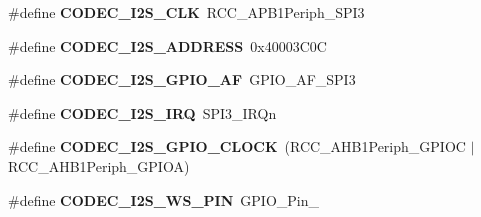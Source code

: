 \begin{DoxyCompactItemize}
\item 
\hypertarget{group___s_t_m32_f4___d_i_s_c_o_v_e_r_y___a_u_d_i_o___c_o_d_e_c___exported___constants_ga77e374b91de4f4bd2df16b28ca973553}{\#define {\bfseries C\-O\-D\-E\-C\-\_\-\-I2\-S\-\_\-\-C\-L\-K}~R\-C\-C\-\_\-\-A\-P\-B1\-Periph\-\_\-\-S\-P\-I3}\label{group___s_t_m32_f4___d_i_s_c_o_v_e_r_y___a_u_d_i_o___c_o_d_e_c___exported___constants_ga77e374b91de4f4bd2df16b28ca973553}

\item 
\hypertarget{group___s_t_m32_f4___d_i_s_c_o_v_e_r_y___a_u_d_i_o___c_o_d_e_c___exported___constants_gaff14a601909227234350c186a7bf0ea5}{\#define {\bfseries C\-O\-D\-E\-C\-\_\-\-I2\-S\-\_\-\-A\-D\-D\-R\-E\-S\-S}~0x40003\-C0\-C}\label{group___s_t_m32_f4___d_i_s_c_o_v_e_r_y___a_u_d_i_o___c_o_d_e_c___exported___constants_gaff14a601909227234350c186a7bf0ea5}

\item 
\hypertarget{group___s_t_m32_f4___d_i_s_c_o_v_e_r_y___a_u_d_i_o___c_o_d_e_c___exported___constants_ga1e5aba68422907a9a319ab444e40a8dd}{\#define {\bfseries C\-O\-D\-E\-C\-\_\-\-I2\-S\-\_\-\-G\-P\-I\-O\-\_\-\-A\-F}~G\-P\-I\-O\-\_\-\-A\-F\-\_\-\-S\-P\-I3}\label{group___s_t_m32_f4___d_i_s_c_o_v_e_r_y___a_u_d_i_o___c_o_d_e_c___exported___constants_ga1e5aba68422907a9a319ab444e40a8dd}

\item 
\hypertarget{group___s_t_m32_f4___d_i_s_c_o_v_e_r_y___a_u_d_i_o___c_o_d_e_c___exported___constants_ga96ef2e113c518e61212771532c6de8bd}{\#define {\bfseries C\-O\-D\-E\-C\-\_\-\-I2\-S\-\_\-\-I\-R\-Q}~S\-P\-I3\-\_\-\-I\-R\-Qn}\label{group___s_t_m32_f4___d_i_s_c_o_v_e_r_y___a_u_d_i_o___c_o_d_e_c___exported___constants_ga96ef2e113c518e61212771532c6de8bd}

\item 
\hypertarget{group___s_t_m32_f4___d_i_s_c_o_v_e_r_y___a_u_d_i_o___c_o_d_e_c___exported___constants_ga63156429ccf84bdbc35f3f2c36dfca07}{\#define {\bfseries C\-O\-D\-E\-C\-\_\-\-I2\-S\-\_\-\-G\-P\-I\-O\-\_\-\-C\-L\-O\-C\-K}~(R\-C\-C\-\_\-\-A\-H\-B1\-Periph\-\_\-\-G\-P\-I\-O\-C $|$ R\-C\-C\-\_\-\-A\-H\-B1\-Periph\-\_\-\-G\-P\-I\-O\-A)}\label{group___s_t_m32_f4___d_i_s_c_o_v_e_r_y___a_u_d_i_o___c_o_d_e_c___exported___constants_ga63156429ccf84bdbc35f3f2c36dfca07}

\item 
\hypertarget{group___s_t_m32_f4___d_i_s_c_o_v_e_r_y___a_u_d_i_o___c_o_d_e_c___exported___constants_gaadb2abc19b3f4120179bc3a2b8867216}{\#define {\bfseries C\-O\-D\-E\-C\-\_\-\-I2\-S\-\_\-\-W\-S\-\_\-\-P\-I\-N}~G\-P\-I\-O\-\_\-\-Pin\-\_}\label{group___s_t_m32_f4___d_i_s_c_o_v_e_r_y___a_u_d_i_o___c_o_d_e_c___exported___constants_gaadb2abc19b3f4120179bc3a2b8867216}


\end{DoxyCompactItemize}
